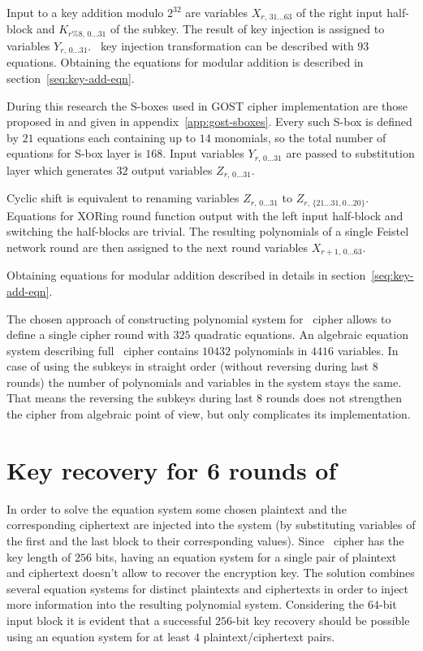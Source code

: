 Input to a key addition modulo $2^{32}$ are variables
$X_{r, \, 31 \hdots 63}$ of the right input half-block and
$K_{r \% 8, \, 0 \hdots 31}$ of the subkey. The result of key injection is
assigned to variables $Y_{r, \, 0 \hdots 31}$. \gost\ key injection
transformation can be described with $93$ equations. Obtaining the equations
for modular addition is described in section~\ref{seq:key-add-eqn}.

During this research the S-boxes used in GOST cipher implementation are those
proposed in \cite{GOST3411} and given in appendix~\ref{app:gost-sboxes}. Every
such S-box is defined by $21$ equations each containing up to $14$ monomials, so
the total number of equations for S-box layer is $168$.  Input variables
$Y_{r, \, 0 \hdots 31}$ are passed to substitution layer which generates $32$
output variables $Z_{r, \, 0 \hdots 31}$.

Cyclic shift is equivalent to renaming variables $Z_{r, \, 0 \hdots 31}$ to
$Z_{r, \, \{21 \hdots 31, 0 \hdots 20\}}$. Equations for XORing round function
output with the left input half-block and switching the half-blocks are
trivial. The resulting polynomials of a single Feistel network round are then
assigned to the next round variables $X_{r+1, \, 0 \hdots 63}$.

Obtaining equations for modular addition described in details in
section~\ref{seq:key-add-eqn}.

The chosen approach of constructing polynomial system for \gost\ cipher
allows to define a single cipher round with $325$ quadratic equations. An
algebraic equation system describing full \gost\ cipher contains $10432$
polynomials in $4416$ variables. In case of using the subkeys in straight
order (without reversing during last $8$ rounds) the number of polynomials and
variables in the system stays the same. That means the reversing the subkeys
during last $8$ rounds does not strengthen the cipher from algebraic point of
view, but only complicates its implementation.

\section{Key recovery for 6 rounds of \gost}
\label{sec:gost-key-rec}

In order to solve the equation system some chosen plaintext and the
corresponding ciphertext are injected into the system (by substituting
variables of the first and the last block to their corresponding values).
Since \gost\ cipher has the key length of $256$ bits, having an equation
system for a single pair of plaintext and ciphertext doesn't allow to recover
the encryption key. The solution combines several equation systems for
distinct plaintexts and ciphertexts in order to inject more information into
the resulting polynomial system. Considering the $64$-bit input block it is
evident that a successful $256$-bit key recovery should be possible using an
equation system for at least $4$ \mbox{plaintext/ciphertext} pairs.


